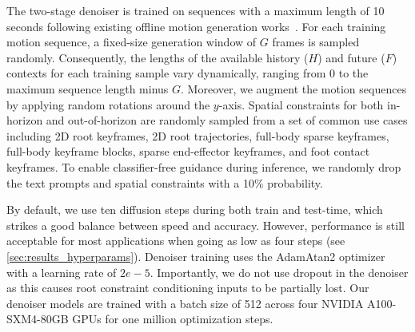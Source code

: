 The two-stage denoiser is trained on sequences with a maximum length of 10 seconds following existing offline motion generation works~\cite{tevet2023mdm, pinyoanuntapong2025MaskControl}. For each training motion sequence, a fixed-size generation window of $G$ frames is sampled randomly. Consequently, the lengths of the available history ($H$) and future ($F$) contexts for each training sample vary dynamically, ranging from 0 to the maximum sequence length minus $G$. 
Moreover, we augment the motion sequences by applying random rotations around the $y$-axis.
Spatial constraints for both in-horizon and out-of-horizon are randomly sampled from a set of common use cases including 2D root keyframes, 2D root trajectories, full-body sparse keyframes, full-body keyframe blocks, sparse end-effector keyframes, and foot contact keyframes.
To enable classifier-free guidance \cite{hoClassifierFreeDiffusionGuidance2022} during inference, we randomly drop the text prompts and spatial constraints with a 10\% probability. 

By default, we use ten diffusion steps during both train and test-time, which strikes a good balance between speed and accuracy. However, performance is still acceptable for most applications when going as low as four steps (see \cref{sec:results_hyperparams}). 
Denoiser training uses the AdamAtan2 optimizer with a learning rate of $2e{-}5$. 
Importantly, we do not use dropout in the denoiser as this causes root constraint conditioning inputs to be partially lost.
Our denoiser models are trained with a batch size of 512 across four NVIDIA A100-SXM4-80GB GPUs for one million optimization steps.

